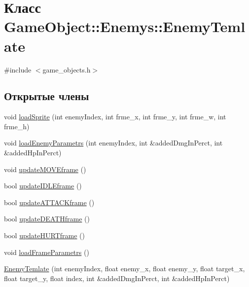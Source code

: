 \hypertarget{classGameObject_1_1Enemys_1_1EnemyTemlate}{}\section{Класс Game\+Object\+:\+:Enemys\+:\+:Enemy\+Temlate}
\label{classGameObject_1_1Enemys_1_1EnemyTemlate}


{\ttfamily \#include $<$game\+\_\+objects.\+h$>$}

\subsection*{Открытые члены}
\begin{DoxyCompactItemize}
\item 
void \hyperlink{classGameObject_1_1Enemys_1_1EnemyTemlate_ae65af0b44209fea4e92e5f13d2a09f6f}{load\+Sprite} (int enemy\+Index, int frme\+\_\+x, int frme\+\_\+y, int frme\+\_\+w, int frme\+\_\+h)
\item 
void \hyperlink{classGameObject_1_1Enemys_1_1EnemyTemlate_a5f9b71a23bb65baf0af246a2fd6f7439}{load\+Enemy\+Parametrs} (int enemy\+Index, int \&added\+Dmg\+In\+Perct, int \&added\+Hp\+In\+Perct)
\item 
void \hyperlink{classGameObject_1_1Enemys_1_1EnemyTemlate_afbc5887043ffe63e87a396365902cf23}{update\+M\+O\+V\+Eframe} ()
\item 
bool \hyperlink{classGameObject_1_1Enemys_1_1EnemyTemlate_ad214c3fa0f38bdb49ac63d87fa61f812}{update\+I\+D\+L\+Eframe} ()
\item 
bool \hyperlink{classGameObject_1_1Enemys_1_1EnemyTemlate_a63fc3c91c32d4094ba613331a3be9fb7}{update\+A\+T\+T\+A\+C\+Kframe} ()
\item 
bool \hyperlink{classGameObject_1_1Enemys_1_1EnemyTemlate_a95af63af76be29f49e8b5f13202c3078}{update\+D\+E\+A\+T\+Hframe} ()
\item 
bool \hyperlink{classGameObject_1_1Enemys_1_1EnemyTemlate_a0d5ab41f2654eef85f7019e22e363cb5}{update\+H\+U\+R\+Tframe} ()
\item 
void \hyperlink{classGameObject_1_1Enemys_1_1EnemyTemlate_a781585615f490f3033e6be408f437ebf}{load\+Frame\+Parametrs} ()
\item 
\hyperlink{classGameObject_1_1Enemys_1_1EnemyTemlate_accd430f7aa9e273cdb31bc0f3ae29d64}{Enemy\+Temlate} (int enemy\+Index, float enemy\+\_\+x, float enemy\+\_\+y, float target\+\_\+x, float target\+\_\+y, float index, int \&added\+Dmg\+In\+Perct, int \&added\+Hp\+In\+Perct)
\end{DoxyCompactItemize}

